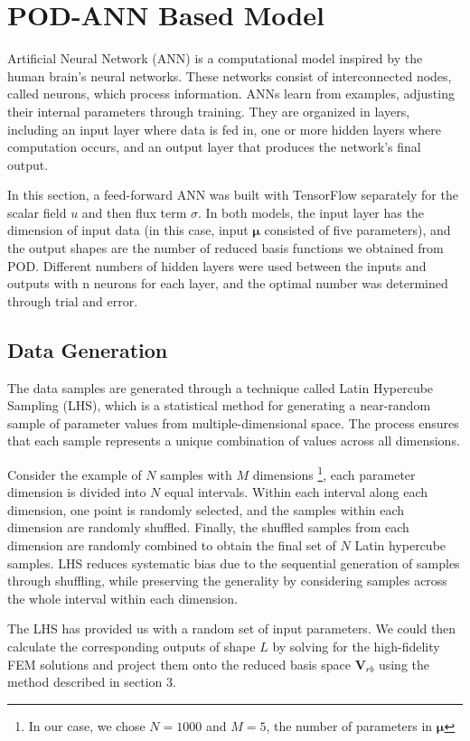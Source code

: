 \section{POD-ANN Based Model}

Artificial Neural Network (ANN) is a computational model inspired by the human brain's neural networks. These networks consist of interconnected nodes, called neurons, which process information. ANNs learn from examples, adjusting their internal parameters through training. They are organized in layers, including an input layer where data is fed in, one or more hidden layers where computation occurs, and an output layer that produces the network's final output.

In this section, a feed-forward ANN was built with TensorFlow separately for the scalar field $u$ and then flux term $\sigma$. In both models, the input layer has the dimension of input data (in this case, input $\bm{\mu}$ consisted of five parameters), and the output shapes are the number of reduced basis functions we obtained from POD. Different numbers of hidden layers were used between the inputs and outputs with n neurons for each layer, and the optimal number was determined through trial and error.  

\subsection{Data Generation}
The data samples are generated through a technique called Latin Hypercube Sampling (LHS), which is a statistical method for generating a near-random sample of parameter values from multiple-dimensional space. The process ensures that each sample represents a unique combination of values across all dimensions. 

Consider the example of $N$ samples with $M$ dimensions \footnote{In our case, we chose $N=1000$ and $M=5$, the number of parameters in $\mathbf{\mu}$}, each parameter dimension is divided into $N$ equal intervals. Within each interval along each dimension, one point is randomly selected, and the samples within each dimension are randomly shuffled. Finally, the shuffled samples from each dimension are randomly combined to obtain the final set of $N$ Latin hypercube samples. LHS reduces systematic bias due to the sequential generation of samples through shuffling, while preserving the generality by considering samples across the whole interval within each dimension. 

The LHS has provided us with a random set of input parameters. We could then calculate the corresponding outputs of shape $L$ by solving for the high-fidelity FEM solutions and project them onto the reduced basis space $\mathbf{V}_{rb}$ using the method described in section 3. 

